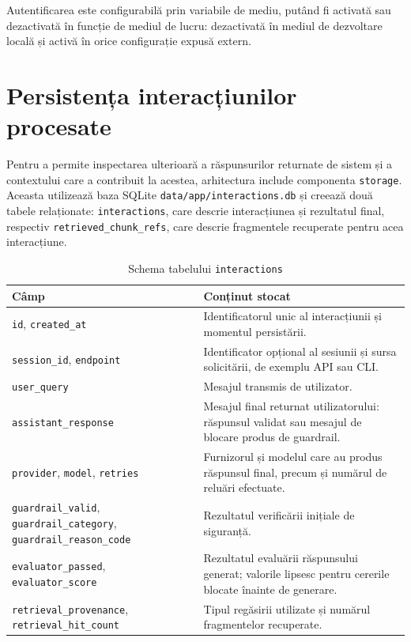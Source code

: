 \documentclass[12pt, a4paper, oneside, romanian]{teza-upb}
\begin{document}
Autentificarea este configurabilă prin variabile de mediu, putând fi 
activată sau dezactivată în funcție de mediul de lucru: 
dezactivată în mediul de dezvoltare locală și activă în orice 
configurație expusă extern.

\section{Persistența interacțiunilor procesate}

Pentru a permite inspectarea ulterioară a răspunsurilor returnate de sistem și a contextului care a contribuit la acestea, arhitectura include componenta \texttt{storage}. Aceasta utilizează baza SQLite \texttt{data/app/interactions.db} și creează două tabele relaționate: \texttt{interactions}, care descrie interacțiunea și rezultatul final, respectiv \texttt{retrieved\_chunk\_refs}, care descrie fragmentele recuperate pentru acea interacțiune.

\begin{table}[H]
\centering
\caption{Schema tabelului \texttt{interactions}}
\begin{tabular}{|p{4cm}|p{9.2cm}|}
\hline
\textbf{Câmp} & \textbf{Conținut stocat} \\
\hline
\texttt{id}, \texttt{created\_at} & Identificatorul unic al interacțiunii și momentul persistării. \\
\hline
\texttt{session\_id}, \texttt{endpoint} & Identificator opțional al sesiunii și sursa solicitării, de exemplu API sau CLI. \\
\hline
\texttt{user\_query} & Mesajul transmis de utilizator. \\
\hline
\texttt{assistant\_response} & Mesajul final returnat utilizatorului: răspunsul validat sau mesajul de blocare produs de guardrail. \\
\hline
\texttt{provider}, \texttt{model}, \texttt{retries} & Furnizorul și modelul care au produs răspunsul final, precum și numărul de reluări efectuate. \\
\hline
\texttt{guardrail\_valid}, \texttt{guardrail\_category}, \texttt{guardrail\_reason\_code} & Rezultatul verificării inițiale de siguranță. \\
\hline
\texttt{evaluator\_passed}, \texttt{evaluator\_score} & Rezultatul evaluării răspunsului generat; valorile lipsesc pentru cererile blocate înainte de generare. \\
\hline
\texttt{retrieval\_provenance}, \texttt{retrieval\_hit\_count} & Tipul regăsirii utilizate și numărul fragmentelor recuperate. \\
\hline
\end{tabular}
\label{tab:interaction-storage}
\end{table}
\end{document}
